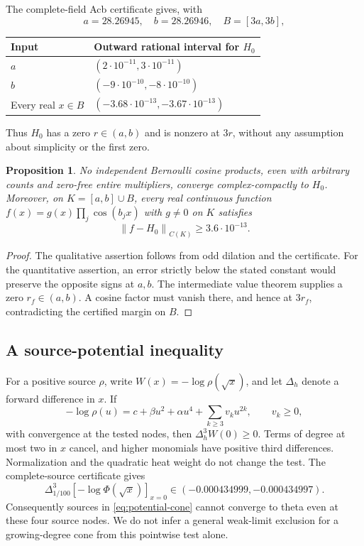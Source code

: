 \documentclass[11pt]{article}
\newtheorem{proposition}[theorem]{Proposition}
\theoremstyle{remark}
\newcommand{\norm}[1]{\left\lVert#1\right\rVert}
\numberwithin{equation}{section}
\begin{document}
The complete-field Acb certificate \cite{records} gives, with
\[
 a=28.26945,\quad b=28.26946,\quad B=[3a,3b],
\]
\begin{center}
\begin{tabular}{ll}
\toprule
Input & Outward rational interval for \(H_0\)\\
\midrule
\(a\) & \((2\cdot10^{-11},3\cdot10^{-11})\)\\
\(b\) & \((-9\cdot10^{-10},-8\cdot10^{-10})\)\\
Every real \(x\in B\) & \((-3.68\cdot10^{-13},-3.67\cdot10^{-13})\)\\
\bottomrule
\end{tabular}
\end{center}
Thus \(H_0\) has a zero \(r\in(a,b)\) and is nonzero at \(3r\), without
any assumption about simplicity or the first zero.

\begin{proposition}\label{prop:cosine}
No independent Bernoulli cosine products, even with arbitrary counts and
zero-free entire multipliers, converge complex-compactly to \(H_0\).
Moreover, on \(K=[a,b]\cup B\), every real continuous function
\(f(x)=g(x)\prod_j\cos(b_jx)\) with \(g\ne0\) on \(K\) satisfies
\begin{equation}\label{eq:cosine-floor}
 \norm{f-H_0}_{C(K)}\ge3.6\cdot10^{-13}.
\end{equation}
\end{proposition}
\begin{proof}
The qualitative assertion follows from odd dilation and the certificate.
For the quantitative assertion, an error strictly below the stated
constant would preserve the opposite signs at \(a,b\). The intermediate
value theorem supplies a zero \(r_f\in(a,b)\). A cosine factor must vanish
there, and hence at \(3r_f\), contradicting the certified margin on \(B\).
\end{proof}

\subsection{A source-potential inequality}
For a positive source \(\rho\), write \(W(x)=-\log\rho(\sqrt x)\), and
let \(\Delta_h\) denote a forward difference in \(x\).
If
\begin{equation}\label{eq:potential-cone}
 -\log\rho(u)=c+\beta u^2+\alpha u^4+\sum_{k\ge3}v_ku^{2k},
 \qquad v_k\ge0,
\end{equation}
with convergence at the tested nodes, then \(\Delta_h^3W(0)\ge0\).
Terms of degree at most two in \(x\) cancel, and higher monomials have
positive third differences. Normalization and the quadratic heat weight
do not change the test. The complete-source certificate gives
\begin{equation}\label{eq:delta3}
 \Delta_{1/100}^3[-\log\Phi(\sqrt x)]_{x=0}
 \in(-0.000434999,-0.000434997).
\end{equation}
Consequently sources in \eqref{eq:potential-cone} cannot converge to theta
even at these four source nodes. We do not infer a general weak-limit
exclusion for a growing-degree cone from this pointwise test alone.
\end{document}
